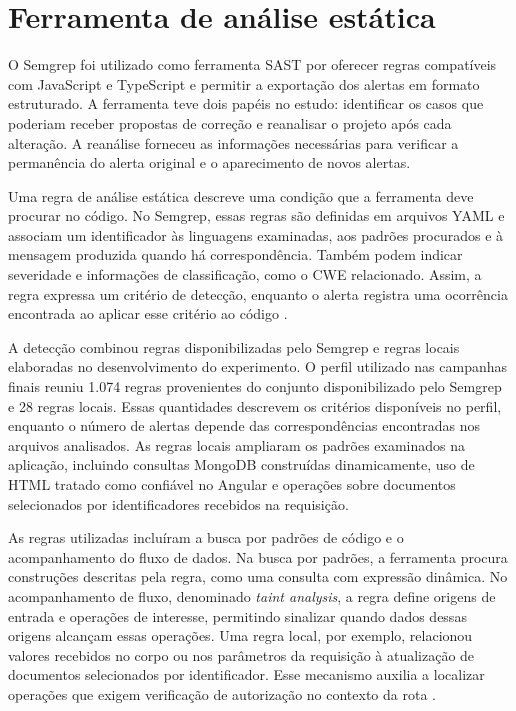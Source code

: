 \section{Ferramenta de análise estática}
\label{sec:met-sast}

O Semgrep foi utilizado como ferramenta SAST por oferecer regras compatíveis com JavaScript e TypeScript e permitir a exportação dos alertas em formato estruturado. A ferramenta teve dois papéis no estudo: identificar os casos que poderiam receber propostas de correção e reanalisar o projeto após cada alteração. A reanálise forneceu as informações necessárias para verificar a permanência do alerta original e o aparecimento de novos alertas.

Uma regra de análise estática descreve uma condição que a ferramenta deve procurar no código. No Semgrep, essas regras são definidas em arquivos YAML e associam um identificador às linguagens examinadas, aos padrões procurados e à mensagem produzida quando há correspondência. Também podem indicar severidade e informações de classificação, como o CWE relacionado. Assim, a regra expressa um critério de detecção, enquanto o alerta registra uma ocorrência encontrada ao aplicar esse critério ao código \cite{semgrep_write_rules}.

A detecção combinou regras disponibilizadas pelo Semgrep e regras locais elaboradas no desenvolvimento do experimento. O perfil utilizado nas campanhas finais reuniu 1.074 regras provenientes do conjunto disponibilizado pelo Semgrep e 28 regras locais. Essas quantidades descrevem os critérios disponíveis no perfil, enquanto o número de alertas depende das correspondências encontradas nos arquivos analisados. As regras locais ampliaram os padrões examinados na aplicação, incluindo consultas MongoDB construídas dinamicamente, uso de HTML tratado como confiável no Angular e operações sobre documentos selecionados por identificadores recebidos na requisição.

As regras utilizadas incluíram a busca por padrões de código e o acompanhamento do fluxo de dados. Na busca por padrões, a ferramenta procura construções descritas pela regra, como uma consulta com expressão dinâmica. No acompanhamento de fluxo, denominado \textit{taint analysis}, a regra define origens de entrada e operações de interesse, permitindo sinalizar quando dados dessas origens alcançam essas operações. Uma regra local, por exemplo, relacionou valores recebidos no corpo ou nos parâmetros da requisição à atualização de documentos selecionados por identificador. Esse mecanismo auxilia a localizar operações que exigem verificação de autorização no contexto da rota \cite{semgrep_taint_analysis}.

